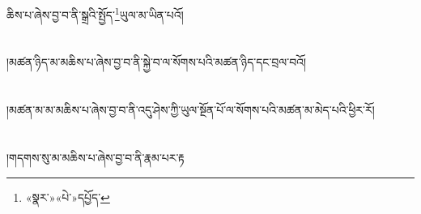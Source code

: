 ཆིས་པ་ཞེས་བྱ་བ་ནི་སྒྲའི་སྤྱོད་\footnote{«སྣར་»«པེ་»དཔྱོད་}ཡུལ་མ་ཡིན་པའོ།\chapter{ }།མཚན་ཉིད་མ་མཆིས་པ་ཞེས་བྱ་བ་ནི་སྐྱེ་བ་ལ་སོགས་པའི་མཚན་ཉིད་དང་བྲལ་བའོ།\chapter{ }།མཚན་མ་མ་མཆིས་པ་ཞེས་བྱ་བ་ནི་འདུ་ཤེས་ཀྱི་ཡུལ་སྔོན་པོ་ལ་སོགས་པའི་མཚན་མ་མེད་པའི་ཕྱིར་རོ།\chapter{ }།གདགས་སུ་མ་མཆིས་པ་ཞེས་བྱ་བ་ནི་རྣམ་པར་རྟ